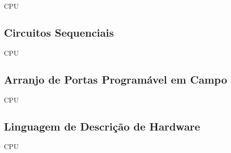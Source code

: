 CPU

\subsection{Circuitos Sequenciais}

CPU

\subsection{Arranjo de Portas Programável em Campo}

CPU

\subsection{Linguagem de Descrição de Hardware}

CPU

